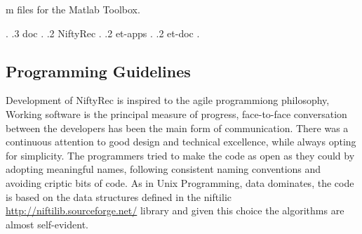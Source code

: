 \documentclass[12pt,a4paper]{report}
\begin{document}
{{\begin{minipage}[t]{7cm}
                                             m files for the Matlab Toolbox.
                                             \end{minipage}}. 
.3 doc                                       . 
.2 NiftyRec       . 
.2 et-apps        . 
.2 et-doc         . 
}



\subsection{Programming Guidelines}
Development of NiftyRec is inspired to the agile programmiong philosophy, Working software is the principal 
measure of progress, face-to-face conversation between the developers has been the main form of communication. 
There was a continuous attention to good design and technical excellence, while always opting for 
simplicity. The programmers tried to make the code as open as they could by adopting meaningful names, following consistent naming 
conventions and avoiding criptic bits of code. 
As in Unix Programming, data dominates, the code is based on the data structures defined in the niftilic \url{http://niftilib.sourceforge.net/} 
library and given this choice the algorithms are almost self-evident.
\end{document}
